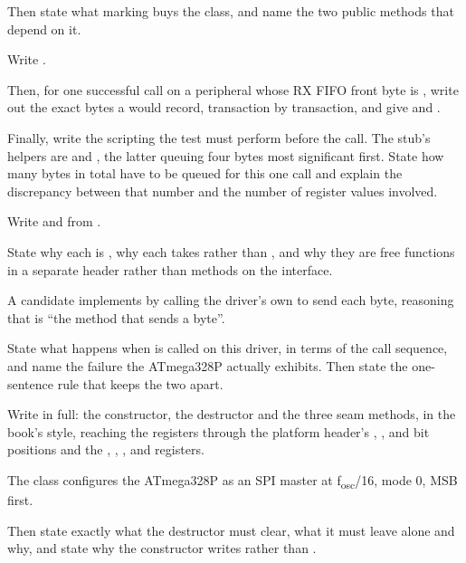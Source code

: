 Then state what marking   buys the class, and name the two public methods
that depend on it. 

 Write .

Then, for one successful call on a peripheral whose RX FIFO front byte is , write out the
exact bytes a  would record, transaction by transaction, and give
 and .

Finally, write the scripting the test must perform before the call. The stub's helpers are
 and , the latter queuing four bytes most
significant first. State how many bytes in total have to be queued for this one call and explain the
discrepancy between that number and the number of register values involved. 

 Write  and  from
.

State why each is , why each takes  rather than , and why
they are free functions in a separate header rather than methods on the interface. 

 A candidate implements  by calling the driver's own  to send
each byte, reasoning that  is ``the method that sends a byte''.

State what happens when  is called on this driver, in terms of the call sequence, and
name the failure the ATmega328P actually exhibits. Then state the one-sentence rule that keeps the
two apart. 

\label{exb:q:7}

 Write  in full: the constructor, the destructor and the
three seam methods, in the book's style, reaching the registers through the platform header's
, ,  and  bit positions and the , ,
,  and  registers.

The class configures the ATmega328P as an SPI master at f\textsubscript{osc}/16, mode 0, MSB first.

Then state exactly what the destructor must clear, what it must leave alone and why, and state why
the constructor writes  rather than . 

